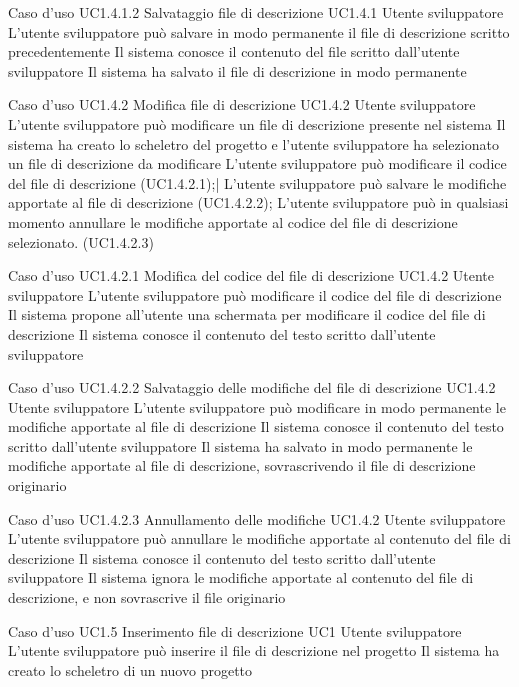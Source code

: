 \UCtitle
{Caso d'uso UC1.4.1.2}
{Salvataggio file di descrizione}
\UC
{UC1.4.1}
{Utente sviluppatore}
{L'utente sviluppatore può salvare in modo permanente il file di descrizione scritto precedentemente}
{Il sistema conosce il contenuto del file scritto dall'utente sviluppatore}
\post
{Il sistema ha salvato il file di descrizione in modo permanente}

\UCtitle
{Caso d'uso UC1.4.2}
{Modifica file di descrizione}
\UC
{UC1.4.2}
{Utente sviluppatore}
{L'utente sviluppatore può modificare un file di descrizione presente nel sistema}
{Il sistema ha creato lo scheletro del progetto e l'utente sviluppatore ha selezionato un file di descrizione da modificare}
\scenario
{L'utente sviluppatore può modificare il codice del file di descrizione (UC1.4.2.1);|
L'utente sviluppatore può salvare le modifiche apportate al file di descrizione (UC1.4.2.2);
}
\estensioni
{L'utente sviluppatore può in qualsiasi momento annullare le modifiche apportate al codice del file di descrizione selezionato. (UC1.4.2.3)
}

\UCtitle
{Caso d'uso UC1.4.2.1}
{Modifica del codice del file di descrizione}
\UC
{UC1.4.2}
{Utente sviluppatore}
{L'utente sviluppatore può modificare il codice del file di descrizione}
{Il sistema propone all'utente una schermata per modificare il codice del file di descrizione}
\post
{Il sistema conosce il contenuto del testo scritto dall'utente sviluppatore}

\UCtitle
{Caso d'uso UC1.4.2.2}
{Salvataggio delle modifiche del file di descrizione}
\UC
{UC1.4.2}
{Utente sviluppatore}
{L'utente sviluppatore può modificare in modo permanente le modifiche apportate al file di descrizione}
{Il sistema conosce il contenuto del testo scritto dall'utente sviluppatore}
\post
{Il sistema ha salvato in modo permanente le modifiche apportate al file di descrizione, sovrascrivendo il file di descrizione originario}

\UCtitle
{Caso d'uso UC1.4.2.3}
{Annullamento delle modifiche}
\UC
{UC1.4.2}
{Utente sviluppatore}
{L'utente sviluppatore può annullare le modifiche apportate al contenuto del file di descrizione}
{Il sistema conosce il contenuto del testo scritto dall'utente sviluppatore}
\post
{Il sistema ignora le modifiche apportate al contenuto del file di descrizione, e non sovrascrive il file originario}

\UCtitle
{Caso d'uso UC1.5}
{Inserimento file di descrizione}
\UC
{UC1}
{Utente sviluppatore}
{L'utente sviluppatore può inserire il file di descrizione nel progetto}
{Il sistema ha creato lo scheletro di un nuovo progetto}



